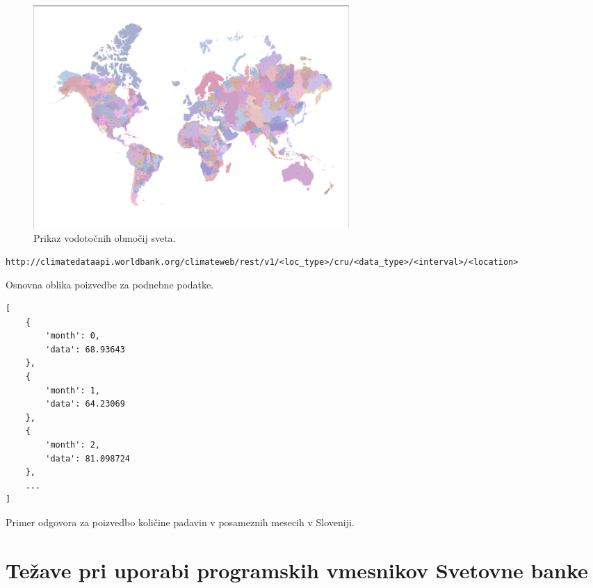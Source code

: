 \begin{figure}
\begin{center}
\includegraphics[width=12cm]{pic/climate_data_api_basins.pdf}
\end{center}
\caption{Prikaz vodotočnih območij sveta.}
\label{climate_data_api_basins}
\end{figure} 


\begin{snippet}
\begin{center}
\begin{lstlisting}
http://climatedataapi.worldbank.org/climateweb/rest/v1/<loc_type>/cru/<data_type>/<interval>/<location>
\end{lstlisting}
\end{center}
\caption{Osnovna oblika poizvedbe za podnebne podatke.}
\label{climate_dataset_request}
\end{snippet} 


\begin{snippet}
\begin{center}
\begin{lstlisting}
[
    {
        'month': 0,
        'data': 68.93643
    },
    {
        'month': 1,
        'data': 64.23069
    },
    {
        'month': 2,
        'data': 81.098724
    },
    ...
]
\end{lstlisting}
\end{center}
\caption{Primer odgovora za poizvedbo količine padavin v posameznih mesecih v 
  Sloveniji.}
\label{climate_dataset_response}
\end{snippet} 






\section{Težave pri uporabi programskih vmesnikov Svetovne banke}
\label{api_gotchas}


